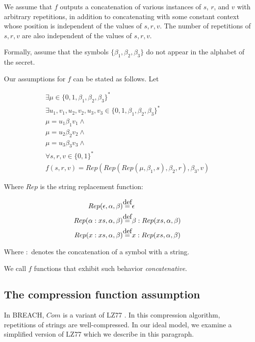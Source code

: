 \documentclass{sig-alternate-05-2015}
\newcommand\defeq{\stackrel{\mathclap{\normalfont\mbox{def}}}{=}}
\begin{document}
We assume that $f$ outputs a concatenation of various instances of $s$, $r$,
and $v$ with arbitrary repetitions, in addition to concatenating with some
constant context whose position is independent of the values of $s, r, v$.  The
number of repetitions of $s, r, v$ are also independent of the values of $s, r,
v$.

Formally, assume that the symbols $\{\beta_1, \beta_2, \beta_3\}$ do not appear
in the alphabet of the secret.

Our assumptions for $f$ can be stated as follows. Let

\begin{equation*}
\begin{split}
\exists \mu \in \{0, 1, \beta_1, \beta_2, \beta_3\}^*\\
\exists u_1, v_1, u_2, v_2, u_3, v_3 \in \{0, 1, \beta_1, \beta_2, \beta_3\}^*\\
\mu = u_1 \beta_1 v_1 \land\\
\mu = u_2 \beta_2 v_2 \land\\
\mu = u_3 \beta_3 v_3 \land\\
\forall s, r, v \in \{0, 1\}^*\\
f(s, r, v) = Rep(Rep(Rep(\mu, \beta_1, s), \beta_2, r), \beta_3, v)
\end{split}
\end{equation*}

Where $Rep$ is the string replacement function:

\begin{align*}
Rep(\epsilon, \alpha, \beta) &\defeq \epsilon\\
Rep(\alpha:xs, \alpha, \beta) &\defeq \beta:Rep(xs, \alpha, \beta)\\
Rep(x:xs, \alpha, \beta) &\defeq x:Rep(xs, \alpha, \beta)
\end{align*}

Where $:$ denotes the concatenation of a symbol with a string.

We call $f$ functions that exhibit such behavior \textit{concatenative}.

\subsection{The compression function assumption}\label{subsec:comfuncassumption}

In BREACH, $Com$ is a variant of LZ77 \cite{c5}. In this compression algorithm,
repetitions of strings are well-compressed. In our ideal model, we examine a
simplified version of LZ77 which we describe in this paragraph.
\end{document}
